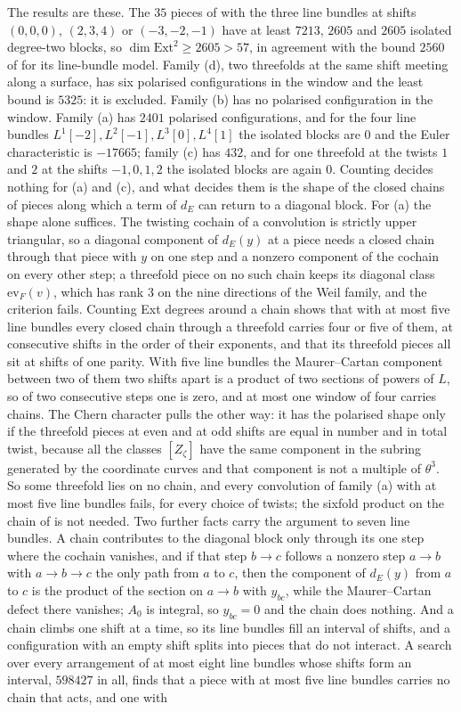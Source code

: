 The results are these. The $35$ pieces of \cite{BB26c} with the three line bundles at shifts $(0,0,0)$, $(2,3,4)$ or $(-3,-2,-1)$ have at least $7213$, $2605$ and $2605$ isolated degree-two blocks, so $\dim\mathrm{Ext}^{2}\ge2605>57$, in agreement with the bound $2560$ of \cite{BMB26b} for its line-bundle model. Family (d), two threefolds at the same shift meeting along a surface, has six polarised configurations in the window and the least bound is $5325$: it is excluded. Family (b) has no polarised configuration in the window. Family (a) has $2401$ polarised configurations, and for the four line bundles $L^{1}[-2],L^{2}[-1],L^{3}[0],L^{4}[1]$ the isolated blocks are $0$ and the Euler characteristic is $-17665$; family (c) has $432$, and for one threefold at the twists $1$ and $2$ at the shifts $-1,0,1,2$ the isolated blocks are again $0$. Counting decides nothing for (a) and (c), and what decides them is the shape of the closed chains of pieces along which a term of $d_{E}$ can return to a diagonal block. For (a) the shape alone suffices. The twisting cochain of a convolution is strictly upper triangular, so a diagonal component of $d_{E}(y)$ at a piece needs a closed chain through that piece with $y$ on one step and a nonzero component of the cochain on every other step; a threefold piece on no such chain keeps its diagonal class $\mathrm{ev}_{F}(v)$, which has rank $3$ on the nine directions of the Weil family, and the criterion fails. Counting Ext degrees around a chain shows that with at most five line bundles every closed chain through a threefold carries four or five of them, at consecutive shifts in the order of their exponents, and that its threefold pieces all sit at shifts of one parity. With five line bundles the Maurer--Cartan component between two of them two shifts apart is a product of two sections of powers of $L$, so of two consecutive steps one is zero, and at most one window of four carries chains. The Chern character pulls the other way: it has the polarised shape only if the threefold pieces at even and at odd shifts are equal in number and in total twist, because all the classes $[Z_{\zeta}]$ have the same component in the subring generated by the coordinate curves and that component is not a multiple of $\theta^{3}$. So some threefold lies on no chain, and every convolution of family (a) with at most five line bundles fails, for every choice of twists; the sixfold product on the chain of \cite{BB26c} is not needed. Two further facts carry the argument to seven line bundles. A chain contributes to the diagonal block only through its one step where the cochain vanishes, and if that step $b\to c$ follows a nonzero step $a\to b$ with $a\to b\to c$ the only path from $a$ to $c$, then the component of $d_{E}(y)$ from $a$ to $c$ is the product of the section on $a\to b$ with $y_{bc}$, while the Maurer--Cartan defect there vanishes; $A_{0}$ is integral, so $y_{bc}=0$ and the chain does nothing. And a chain climbs one shift at a time, so its line bundles fill an interval of shifts, and a configuration with an empty shift splits into pieces that do not interact. A search over every arrangement of at most eight line bundles whose shifts form an interval, $598427$ in all, finds that a piece with at most five line bundles carries no chain that acts, and one with 